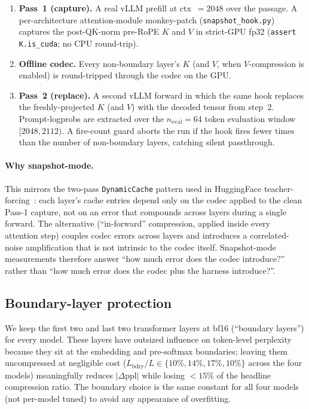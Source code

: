 \documentclass[11pt,a4paper]{article}
\theoremstyle{definition}
\theoremstyle{plain}
\newcommand{\abs}[1]{\left\lvert#1\right\rvert}
\begin{document}
\begin{enumerate}[leftmargin=*]
  \item \textbf{Pass~1 (capture).} A real vLLM prefill at
    ctx~$=\!2048$ over the passage. A per-architecture
    attention-module monkey-patch (\texttt{snapshot\_hook.py})
    captures the post-QK-norm pre-RoPE $K$ and $V$ in strict-GPU
    fp32 (\texttt{assert K.is\_cuda}; no CPU round-trip).
  \item \textbf{Offline codec.} Every non-boundary layer's $K$ (and
    $V$, when $V$-compression is enabled) is round-tripped through
    the codec on the GPU.
  \item \textbf{Pass~2 (replace).} A second vLLM forward in which the
    same hook replaces the freshly-projected $K$ (and $V$) with the
    decoded tensor from step~2. Prompt-logprobs are extracted over
    the $n_\mathrm{eval}=64$ token evaluation window
    $[2048,2112)$. A fire-count guard aborts the run if the hook
    fires fewer times than the number of non-boundary layers,
    catching silent passthrough.
\end{enumerate}

\paragraph{Why snapshot-mode.}
This mirrors the two-pass \texttt{DynamicCache} pattern used in
HuggingFace teacher-forcing~\cite{huggingface-transformers}: each
layer's cache entries depend only on the codec applied to the clean
Pass-1 capture, not on an error that compounds across layers during
a single forward. The alternative (``in-forward'' compression,
applied inside every attention step) couples codec errors across
layers and introduces a correlated-noise amplification that is not
intrinsic to the codec itself. Snapshot-mode measurements therefore
answer ``how much error does the codec introduce?'' rather than
``how much error does the codec plus the harness introduce?''.

\subsection{Boundary-layer protection}

We keep the first two and last two transformer layers at bf16
(``boundary layers'') for every model. These layers have outsized
influence on token-level perplexity because they sit at the
embedding and pre-softmax boundaries; leaving them uncompressed at
negligible cost ($L_\mathrm{bdry}/L \in \{10\%, 14\%, 17\%, 10\%\}$
across the four models) meaningfully reduces
$\abs{\Delta\mathrm{ppl}}$ while losing $< 15\%$ of the headline
compression ratio. The boundary choice is the same constant for all
four models (not per-model tuned) to avoid any appearance of
overfitting.
\end{document}
